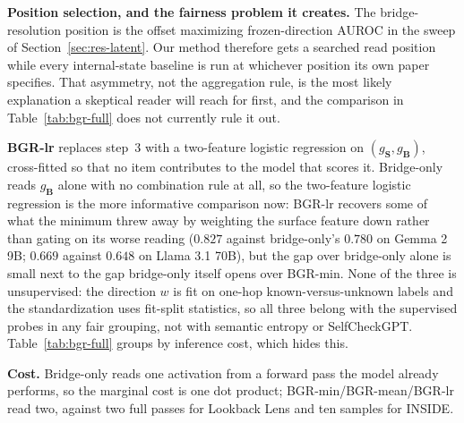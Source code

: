 \documentclass{article}
\newif\ifredflags
\newcommand{\rf}[1]{\ifredflags{\textcolor{red}{\textbf{[MISSING: #1]}}}\fi}
\newcommand{\gate}{\mathbf{S}}
\newcommand{\bridge}{\mathbf{B}}
\begin{document}
\textbf{Position selection, and the fairness problem it creates.} The bridge-resolution position is
the offset maximizing frozen-direction AUROC in the sweep of Section~\ref{sec:res-latent}. Our method
therefore gets a searched read position while every internal-state baseline is run at whichever
position its own paper specifies. That asymmetry, not the aggregation rule, is the most likely
explanation a skeptical reader will reach for first, and the comparison in
Table~\ref{tab:bgr-full} does not currently rule it out.
\rf{one of two protocol repairs, and the paper is not fair without one of them. Either (i) give every
internal-state baseline the same offset-and-layer sweep on the same validation split and report each
at its own best position, or (ii) fix BGR's offset by pre-registration and report it untuned. Option
(i) is the stronger paper. Both require stating which split the sweep ran on, since selecting the
peak on the evaluation items would make BGR tuned on test.}

\textbf{BGR-lr} replaces step~3 with a two-feature logistic regression on
$(g_{\gate},g_{\bridge})$, cross-fitted so that no item contributes to the model that scores it.
\rf{the fold count, the regularization strength and how it was chosen, and the target the regression
is fit against ($Y$ or $M$).} Bridge-only reads $g_{\bridge}$ alone with no combination rule at all, so
the two-feature logistic regression is the more informative comparison now: BGR-lr recovers some of
what the minimum threw away by weighting the surface feature down rather than gating on its worse
reading ($0.827$ against bridge-only's $0.780$ on Gemma 2 9B; $0.669$ against $0.648$ on
Llama 3.1 70B), but the gap over bridge-only alone is small next to the gap bridge-only itself opens over
BGR-min. None of the three is unsupervised: the direction $w$ is fit on one-hop known-versus-unknown
labels and the standardization uses fit-split statistics, so all three belong with the supervised
probes in any fair grouping, not with semantic entropy or SelfCheckGPT. Table~\ref{tab:bgr-full}
groups by inference cost, which hides this.
\rf{a supervision column in Table~\ref{tab:bgr-full} marking each selector as unsupervised,
label-supervised, or supervised-elsewhere, so that the comparison is not read as parameter-free
beating trained detectors.}

\textbf{Cost.} Bridge-only reads one activation from a forward pass the model already performs, so the
marginal cost is one dot product; BGR-min/BGR-mean/BGR-lr read two, against two full passes for
Lookback Lens and ten samples for INSIDE. \rf{measured wall-clock and peak
memory per scored item for every selector in Table~\ref{tab:bgr-full}, on stated hardware. The
one-pass claim is the method's main practical selling point and it is currently supported by a
cost-tier label rather than by a measurement.}
\end{document}
